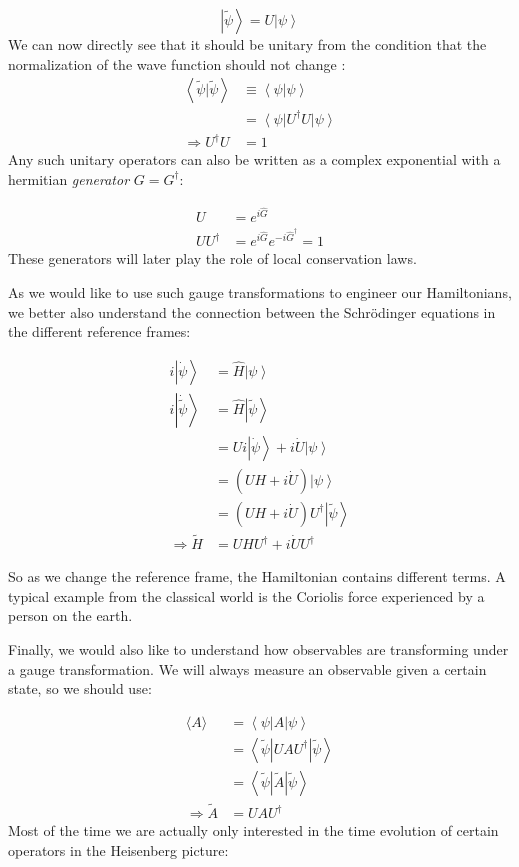 \documentclass[10pt]{article}
\newcommand{\tpsi}{\tilde{\psi}}
\newcommand{\bra}[1]{\ensuremath{\left\langle#1\right|}}
\newcommand{\ket}[1]{\ensuremath{\left|#1\right\rangle}}
\newcommand{\braket}[1]{\ensuremath{\left\langle #1|#1\right\rangle}}
\begin{document}
\begin{equation}
\ket{\tpsi} = U\ket{\psi}
\end{equation}
We can now directly see that it should be unitary from the condition that the normalization of the wave function should not change :
\begin{eqnarray}
\braket{\tpsi} & \equiv \braket{\psi}\\
& =\bra{\psi}U^\dag U\ket{\psi}\\
\Rightarrow U^\dag U & = 1
\end{eqnarray}
Any such unitary operators can also  be written as a complex exponential with a hermitian \textit{generator} $G = G^\dag$:

\begin{eqnarray}
U &= e^{i \hat{G}}\\
UU^\dag &= e^{i \hat{G}}e^{-i \hat{G}^\dag} = 1
\end{eqnarray}
These generators will later play the role of local conservation laws.

As we would like to use such gauge transformations to engineer our Hamiltonians, we better also understand the connection between the Schr\"odinger equations in the different reference frames:

\begin{eqnarray}\label{eq:GaugeTransformation}
i\ket{\dot{\psi}} &= \hat{H}\ket{\psi}\\
i\ket{\dot{\tpsi}} &= \hat{H}\ket{\tpsi}\\
&=  Ui\ket{\dot{\psi}} + i \dot{U}\ket{\psi}\\
&= \left(UH + i\dot{U}\right)\ket{\psi}\\
&= \left(UH + i\dot{U}\right)U^\dag \ket{\tpsi}\\
\Rightarrow \tilde{H} &= UHU^\dag + i\dot{U}U^\dag 
\end{eqnarray}

So as we change the reference frame, the Hamiltonian contains different terms. A typical example from the classical world is the Coriolis force experienced by a person on the earth.

Finally, we would also like to understand how observables are transforming under a gauge transformation. We will always measure an observable given a certain state, so we should use:

\begin{eqnarray}
\langle A \rangle &= \bra{\psi}A\ket{\psi}\\
&=\bra{\tpsi}UAU^\dag\ket{\tpsi}\\
&= \bra{\tpsi}\tilde{A}\ket{\tpsi}\\
\Rightarrow\tilde{A} &=  UAU^\dag
\end{eqnarray}
Most of the time we are actually only interested in the time evolution of certain operators in the Heisenberg picture:
\end{document}
